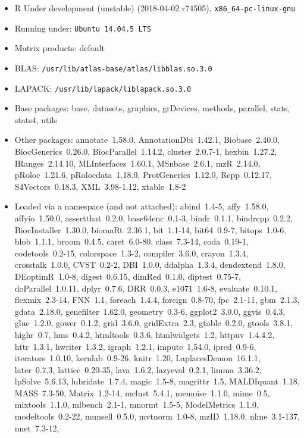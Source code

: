 \documentclass[12pt]{article}\usepackage[]{graphicx}\usepackage[]{color}
\begin{document}
\begin{itemize}\raggedright
  \item R Under development (unstable) (2018-04-02 r74505), \verb|x86_64-pc-linux-gnu|
  \item Running under: \verb|Ubuntu 14.04.5 LTS|
  \item Matrix products: default
  \item BLAS: \verb|/usr/lib/atlas-base/atlas/libblas.so.3.0|
  \item LAPACK: \verb|/usr/lib/lapack/liblapack.so.3.0|
  \item Base packages: base, datasets, graphics, grDevices,
    methods, parallel, stats, stats4, utils
  \item Other packages: annotate~1.58.0, AnnotationDbi~1.42.1,
    Biobase~2.40.0, BiocGenerics~0.26.0, BiocParallel~1.14.2,
    cluster~2.0.7-1, hexbin~1.27.2, IRanges~2.14.10,
    MLInterfaces~1.60.1, MSnbase~2.6.1, mzR~2.14.0, pRoloc~1.21.6,
    pRolocdata~1.18.0, ProtGenerics~1.12.0, Rcpp~0.12.17,
    S4Vectors~0.18.3, XML~3.98-1.12, xtable~1.8-2
  \item Loaded via a namespace (and not attached): abind~1.4-5,
    affy~1.58.0, affyio~1.50.0, assertthat~0.2.0, base64enc~0.1-3,
    bindr~0.1.1, bindrcpp~0.2.2, BiocInstaller~1.30.0,
    biomaRt~2.36.1, bit~1.1-14, bit64~0.9-7, bitops~1.0-6,
    blob~1.1.1, broom~0.4.5, caret~6.0-80, class~7.3-14,
    coda~0.19-1, codetools~0.2-15, colorspace~1.3-2,
    compiler~3.6.0, crayon~1.3.4, crosstalk~1.0.0, CVST~0.2-2,
    DBI~1.0.0, ddalpha~1.3.4, dendextend~1.8.0, DEoptimR~1.0-8,
    digest~0.6.15, dimRed~0.1.0, diptest~0.75-7,
    doParallel~1.0.11, dplyr~0.7.6, DRR~0.0.3, e1071~1.6-8,
    evaluate~0.10.1, flexmix~2.3-14, FNN~1.1, foreach~1.4.4,
    foreign~0.8-70, fpc~2.1-11, gbm~2.1.3, gdata~2.18.0,
    genefilter~1.62.0, geometry~0.3-6, ggplot2~3.0.0, ggvis~0.4.3,
    glue~1.2.0, gower~0.1.2, grid~3.6.0, gridExtra~2.3,
    gtable~0.2.0, gtools~3.8.1, highr~0.7, hms~0.4.2,
    htmltools~0.3.6, htmlwidgets~1.2, httpuv~1.4.4.2, httr~1.3.1,
    hwriter~1.3.2, igraph~1.2.1, impute~1.54.0, ipred~0.9-6,
    iterators~1.0.10, kernlab~0.9-26, knitr~1.20,
    LaplacesDemon~16.1.1, later~0.7.3, lattice~0.20-35,
    lava~1.6.2, lazyeval~0.2.1, limma~3.36.2, lpSolve~5.6.13,
    lubridate~1.7.4, magic~1.5-8, magrittr~1.5, MALDIquant~1.18,
    MASS~7.3-50, Matrix~1.2-14, mclust~5.4.1, memoise~1.1.0,
    mime~0.5, mixtools~1.1.0, mlbench~2.1-1, mnormt~1.5-5,
    ModelMetrics~1.1.0, modeltools~0.2-22, munsell~0.5.0,
    mvtnorm~1.0-8, mzID~1.18.0, nlme~3.1-137, nnet~7.3-12,

\end{itemize}
\end{document}
